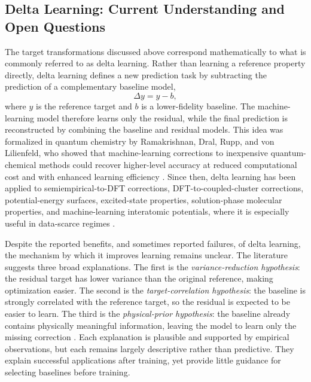 \subsection{Delta Learning: Current Understanding and Open Questions}
\label{sec:delta-learning}

The target transformations discussed above correspond mathematically to what is commonly referred to as delta learning. Rather than learning a reference property directly, delta learning defines a new prediction task by subtracting the prediction of a complementary baseline model,
\[
  \Delta y = y - b,
\]
where \(y\) is the reference target and \(b\) is a lower-fidelity baseline. The machine-learning model therefore learns only the residual, while the final prediction is reconstructed by combining the baseline and residual models. This idea was formalized in quantum chemistry by Ramakrishnan, Dral, Rupp, and von Lilienfeld, who showed that machine-learning corrections to inexpensive quantum-chemical methods could recover higher-level accuracy at reduced computational cost and with enhanced learning efficiency \cite{ramakrishnan2015delta}. Since then, delta learning has been applied to semiempirical-to-DFT corrections, DFT-to-coupled-cluster corrections, potential-energy surfaces, excited-state properties, solution-phase molecular properties, and machine-learning interatomic potentials, where it is especially useful in data-scarce regimes \cite{atz2022deltaqml,chen2023solutiondelta,dral2020hierarchical,krug2025aha}.

Despite the reported benefits, and sometimes reported failures, of delta learning, the mechanism by which it improves learning remains unclear. The literature suggests three broad explanations. The first is the \emph{variance-reduction hypothesis}: the residual target has lower variance than the original reference, making optimization easier. The second is the \emph{target-correlation hypothesis}: the baseline is strongly correlated with the reference target, so the residual is expected to be easier to learn. The third is the \emph{physical-prior hypothesis}: the baseline already contains physically meaningful information, leaving the model to learn only the missing correction \cite{ramakrishnan2015delta,atz2022deltaqml}. Each explanation is plausible and supported by empirical observations, but each remains largely descriptive rather than predictive. They explain successful applications after training, yet provide little guidance for selecting baselines before training.


